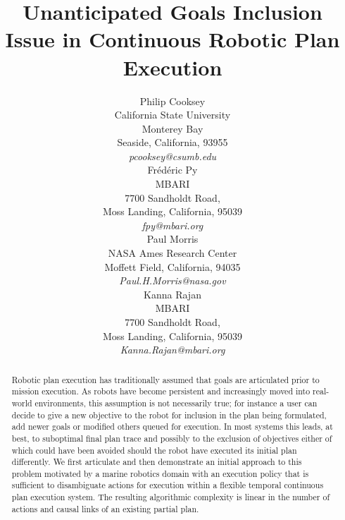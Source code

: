 \documentclass[letterpaper]{article}
\begin{document}
\title{Unanticipated Goals Inclusion Issue in Continuous Robotic Plan Execution}
\author{Philip Cooksey\\
\small{California State University}\\ 
\small{Monterey Bay}\\
\small{Seaside, California, 93955}\\
\small{\emph{pcooksey@csumb.edu}}\\
\And Fr\'ed\'eric Py\\
\small{MBARI}\\
\small{7700 Sandholdt Road,}\\
\small{Moss Landing, California, 95039}\\
\small{\emph{fpy@mbari.org}}\\
\And Paul Morris\\
\small{NASA Ames Research Center}\\
\small{Moffett Field, California, 94035}\\
\small{\emph{Paul.H.Morris@nasa.gov}}\\
\And Kanna Rajan\\
\small{MBARI}\\
\small{7700 Sandholdt Road,}\\
\small{Moss Landing, California, 95039}\\
\small{\emph{Kanna.Rajan@mbari.org}}\\
}

\maketitle{}

\begin{abstract}

  Robotic plan execution has traditionally assumed that goals are
  articulated prior to mission execution. As robots have become
  persistent and increasingly moved into real-world environments, this
  assumption is not necessarily true; for instance a user can decide
  to give a new objective to the robot for inclusion in the plan being
  formulated, add newer goals or modified others queued for
  execution. In most systems this leads, at best, to suboptimal final
  plan trace and possibly to the exclusion of objectives either of
  which could have been avoided should the robot have executed 
  its initial plan differently.
  We first articulate and then demonstrate an initial approach to this
  problem motivated by a marine robotics domain with an execution
  policy that is sufficient to disambiguate actions for execution
  within a flexible temporal continuous plan execution system.  The
  resulting algorithmic complexity is linear in the number of actions
  and causal links of an existing partial plan.

\end{abstract}
\end{document}
